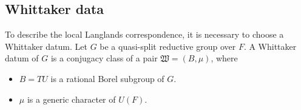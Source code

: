 \documentclass[article]{article}
\numberwithin{equation}{section}
\theoremstyle{definition}
\DeclareMathOperator{\SO}{SO}
\begin{document}
\subsection{Whittaker data}\label{whittaker}
To describe the local Langlands correspondence, it is necessary to choose a Whittaker datum. Let $G$ be a quasi-split reductive group over $F$. A Whittaker datum of $G$ is a conjugacy class of a pair $\mathfrak W=(B,\mu)$, where 
\begin{itemize}
	\item $B=TU$ is a rational Borel subgroup of $G$. 
	\item $\mu$ is a generic character of $U(F)$.
\end{itemize}
\begin{comment}
Note that when $V_{2n}$ is associated to $(d,c)$, $\mathrm O(V_{2n})$ is quasi-spit but not connected, in this case, we define the Whittaker datum of $\mathrm O(V_{2n})$ to be the Whittaker datum of $\SO(V_{2n})$. 
\end{comment}
\end{document}
